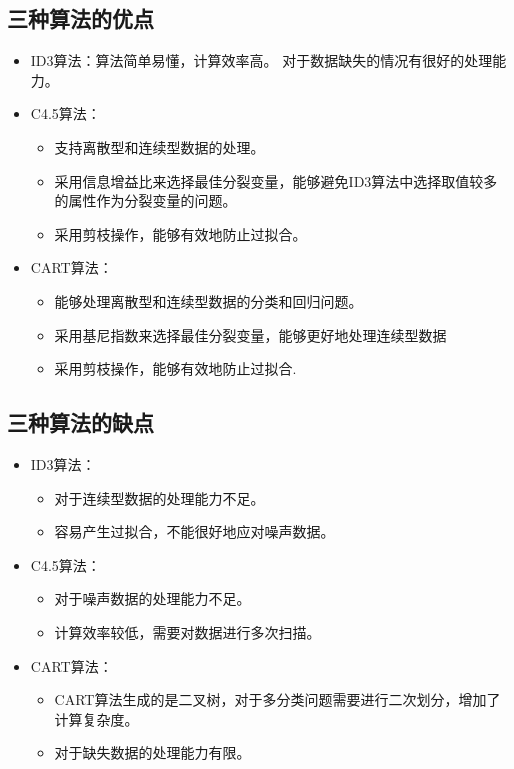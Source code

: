 \documentclass{SHUarticle}
\begin{document}
\subsection{三种算法的优点}
\begin{itemize}
	\item ID3算法：算法简单易懂，计算效率高。
	对于数据缺失的情况有很好的处理能力。
	\item C4.5算法：
	\begin{itemize}
		\item 支持离散型和连续型数据的处理。
		\item  采用信息增益比来选择最佳分裂变量，能够避免ID3算法中选择取值较多的属性作为分裂变量的问题。
		\item 采用剪枝操作，能够有效地防止过拟合。
	\end{itemize}
	\item CART算法：
	\begin{itemize}
		\item 能够处理离散型和连续型数据的分类和回归问题。
		\item 采用基尼指数来选择最佳分裂变量，能够更好地处理连续型数据
		\item 采用剪枝操作，能够有效地防止过拟合.
	\end{itemize}
\end{itemize}
\subsection{三种算法的缺点}
\begin{itemize}
	\item ID3算法：
	\begin{itemize}
		\item 对于连续型数据的处理能力不足。
		\item 容易产生过拟合，不能很好地应对噪声数据。
	\end{itemize}
	\item C4.5算法：
	\begin{itemize}
		\item 对于噪声数据的处理能力不足。
		\item 计算效率较低，需要对数据进行多次扫描。
	\end{itemize}
	\item CART算法：
	\begin{itemize}
		\item CART算法生成的是二叉树，对于多分类问题需要进行二次划分，增加了计算复杂度。
		\item 对于缺失数据的处理能力有限。
	\end{itemize}
\end{itemize}
\end{document}
